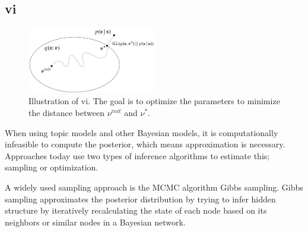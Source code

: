 \subsection{\acrlong{vi}}

\begin{figure}[b]
	\centering
	\includegraphics[width=0.5\textwidth]{figures/vi_illustration.png}
	\caption[Caption for LOF]{Illustration of \acrlong{vi}\footnotemark. The goal is to optimize the parameters to minimize the distance between $\nu^{init}$ and $\nu^*$.}
	\label{fig:vi}
\end{figure}

When using topic models and other Bayesian models, it is computationally infeasible to compute the posterior, which means approximation is necessary. 
Approaches today use two types of inference algorithms to estimate this; sampling or optimization.

A widely used sampling approach is the MCMC algorithm Gibbs sampling.
Gibbs sampling approximates the posterior distribution by trying to infer hidden structure by iteratively recalculating the state of each node based on its neighbors or similar nodes in a Bayesian network.

